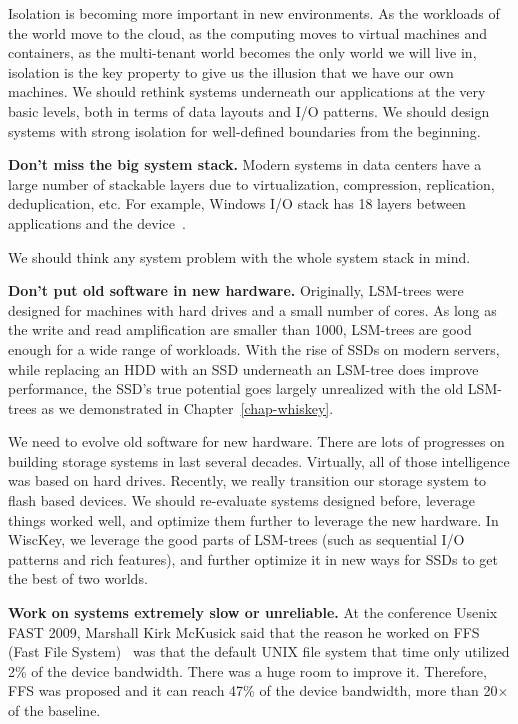 Isolation is becoming more important in new environments. As the
workloads of the world move to the cloud, as the computing moves to
virtual machines and containers, as the multi-tenant world becomes the
only world we will live in, isolation is the key property to give us
the illusion that we have our own machines. We should rethink systems 
underneath our applications at the very basic levels, both in terms of 
data layouts and I/O patterns. We should design systems with strong
isolation for well-defined boundaries from the beginning. 

\vspace{0.1in} \noindent \textbf{Don't miss the big system stack.}
Modern systems in data centers have a large number of stackable layers
due to virtualization, compression, replication, deduplication,
etc. For example, Windows I/O stack has 18 layers between applications and the
device~\cite{thereska2013ioflow}. 

We should think any system problem with the whole system stack in
mind.  
\fi 


\vspace{0.1in} \noindent \textbf{Don't put old software in new hardware.}
Originally, LSM-trees were designed for machines with hard drives and 
a small number of cores. As long as the write and read amplification
are smaller than 1000, LSM-trees are good enough for a wide range of
workloads.  With the rise of SSDs on modern servers, while replacing
an HDD with an SSD underneath an LSM-tree does improve performance,
the SSD's true potential goes largely unrealized with the old
LSM-trees as we demonstrated in Chapter~\ref{chap-whiskey}. 

We need to evolve old software for new hardware. There are lots of
progresses on building storage systems in last several decades.
Virtually, all of those intelligence was based on hard drives. 
Recently, we really transition our storage system to flash based
devices. We should re-evaluate systems designed before, leverage
things worked well, and optimize them further to leverage the new
hardware. In WiscKey, we leverage the good parts of LSM-trees 
(such as sequential I/O patterns and rich features), and
further optimize it in new ways for SSDs to get the best of two
worlds. 

\vspace{0.1in} \noindent \textbf{Work on systems extremely slow or unreliable.}
At the conference Usenix FAST 2009, Marshall Kirk McKusick said that
the reason he worked on FFS (Fast File System)~\cite{McKusickEtAl-FFS-84} was 
that the default UNIX file system that time only utilized 2\% of the device 
bandwidth. There was a huge room to improve it. Therefore, FFS was
proposed and it can reach 47\% of the device bandwidth, more than
20$\times$ of the baseline. 

